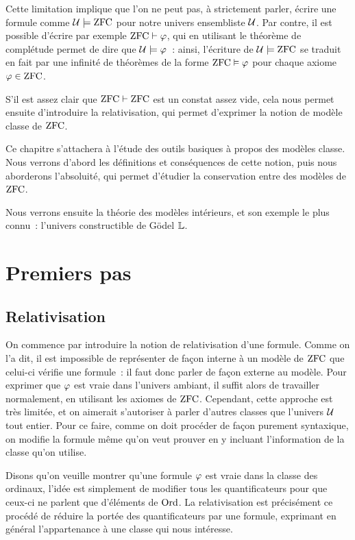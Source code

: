 Cette limitation implique que l'on ne peut pas, à strictement parler, écrire une
formule comme $\mathcal{U}\models \operatorname{ZFC}$ pour notre univers ensembliste $\mathcal{U}$. Par
contre, il est possible d'écrire par exemple $\operatorname{ZFC}\vdash \varphi$, qui en utilisant
le théorème de complétude permet de dire que $\mathcal{U}\models \varphi$~: ainsi,
l'écriture de $\mathcal{U}\models\operatorname{ZFC}$ se traduit en fait par une infinité de
théorèmes de la forme $\operatorname{ZFC}\vDash\varphi$ pour chaque axiome $\varphi \in \operatorname{ZFC}$.

S'il est assez clair que $\operatorname{ZFC}\vdash\operatorname{ZFC}$ est un constat assez vide, cela nous
permet ensuite d'introduire la relativisation, qui permet d'exprimer la notion
de modèle classe de $\operatorname{ZFC}$.

Ce chapitre s'attachera à l'étude des outils basiques à propos des modèles
classe. Nous verrons d'abord les définitions et conséquences de cette notion,
puis nous aborderons l'absoluité, qui permet d'étudier la conservation entre des
modèles de $\operatorname{ZFC}$.

Nous verrons ensuite la théorie des modèles intérieurs, et son exemple le plus
connu~: l'univers constructible de Gödel $\mathbb L$.

\section{Premiers pas}

\subsection{Relativisation}

On commence par introduire la notion de relativisation d'une formule. Comme on
l'a dit, il est impossible de représenter de façon interne à un modèle de $\operatorname{ZFC}$
que celui-ci vérifie une formule~: il faut donc parler de façon externe au
modèle. Pour exprimer que $\varphi$ est vraie dans l'univers ambiant, il suffit
alors de travailler normalement, en utilisant les axiomes de $\operatorname{ZFC}$. Cependant,
cette approche est très limitée, et on aimerait s'autoriser à parler d'autres
classes que l'univers $\mathcal{U}$ tout entier. Pour ce faire, comme on doit
procéder de façon purement syntaxique, on modifie la formule même qu'on veut
prouver en y incluant l'information de la classe qu'on utilise.

Disons qu'on veuille montrer qu'une formule $\varphi$ est vraie dans la classe
des ordinaux, l'idée est simplement de modifier tous les quantificateurs pour
que ceux-ci ne parlent que d'éléments de $\operatorname{Ord}$. La relativisation est
précisément ce procédé de réduire la portée des quantificateurs par une formule,
exprimant en général l'appartenance à une classe qui nous intéresse.

